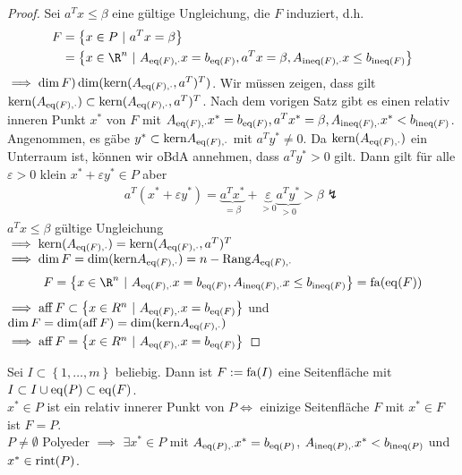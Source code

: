 \begin{proof}
	Sei $a^{T} x \leq \beta$ eine gültige Ungleichung, die $F$ induziert, d.h.
	\begin{align*}
		F &= \left\{ x \in P \ |\ a^{T} x= \beta \right\}\\
		  &= \left\{x \in \R^n \ |\ A_{\eq(F),\cdot} x = b_{\eq(F)}, a^{T} x = \beta, A_{\ineq(F),\cdot} x \leq b_{\ineq(F)} \right\}
	\end{align*}
	$\implies \dim F ) \dim(\text{kern}(A_{\operatorname{eq}(F),\cdot},a^{T} )^{T} )$.
	Wir müssen zeigen, dass gilt  $\text{kern}(A_{\operatorname{eq}(F),\cdot}) \subset  \text{kern}(A_{\operatorname{eq}(F),\cdot},a^{T} )^{T}$.
	Nach dem vorigen Satz gibt es einen relativ inneren Punkt $x^*$ von $F$ mit $A_{\operatorname{eq}(F),\cdot}x^* = b_{\operatorname{eq}(F)}, a^{T} x^* =\beta, A_{\operatorname{ineq}(F),\cdot}x^* < b_{\operatorname{ineq}(F)}$.
	Angenommen, es gäbe $y^* \subset \text{kern} A_{\operatorname{eq}(F),\cdot}$ mit $a^{T} y^* \neq 0$. Da $\text{kern}(A_{\operatorname{eq}(F),\cdot})$ ein Unterraum ist, können wir oBdA annehmen, dass $a^{T} y^* > 0 $ gilt.
	Dann gilt für alle $\varepsilon > 0$ klein $x^* + \varepsilon y^* \in P$ aber 
	\begin{align*}
		a^{T} (x^* + \varepsilon y^*) = \underbrace{a^{T} x^*}_{= \beta} + \underbrace{\varepsilon}_{>0} \underbrace{a^{T} y^*}_{>0} > \beta \lightning
	\end{align*}
	$a^{T} x \leq \beta$ gültige Ungleichung \\
	$\implies \text{kern}(A_{\operatorname{eq}(F),\cdot}) = \text{kern}( A_{\operatorname{eq}(F),\cdot}, a^{T} )^{T} $\\
	$\implies \dim F = \dim (\text{kern}A_{\operatorname{eq}(F),\cdot}  ) = n - \text{Rang}A_{\operatorname{eq}(F),\cdot} $ 
\begin{equation*}
	F = \left\{ x \in \R^n \ |\ A_{\eq(F),\cdot} x = b_{\eq(F)}, A_{\ineq(F),\cdot} x \leq b_{\ineq(F)} \right\} = \fa(\eq(F))
\end{equation*}
$\implies \aff F \subset  \left\{ x \in R^n \ |\ A_{\eq(F),\cdot}x = b_{\eq(F)} \right\}$ und $\dim F = \dim ( \operatorname{aff} F) = \dim (\text{kern}A_{\operatorname{eq}(F),\cdot})$\\
$\implies \aff F = \left\{ x \in R^n \ |\ A_{\eq(F),\cdot}x = b_{\eq(F)} \right\}$
\end{proof}
Sei $I \subset \left\{1,\dots ,m \right\}$ beliebig. Dann ist $F:=\operatorname{fa}(I)$ eine Seitenfläche mit $I \subset  I \cup \operatorname{eq}(P) \subset \operatorname{eq}(F) $.\\
$x^* \in P$ ist ein relativ innerer Punkt von $P \iff$ einizige Seitenfläche $F$ mit $x^* \in F$ ist $F = P$.\\
$P \neq \emptyset$ Polyeder $\implies$ $\exists x^* \in P$ mit $A_{\operatorname{eq}(P),\cdot}x^* = b_{\operatorname{eq}(P)}$, $A_{\operatorname{ineq}(P),\cdot}x^* < b_{\operatorname{ineq}(P)}$ und $x^* \in \operatorname{rint}(P)$.
